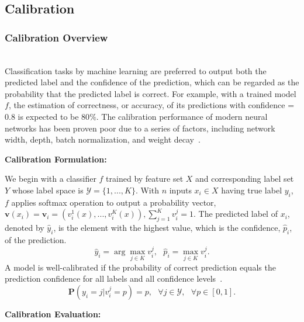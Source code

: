\subsection{Calibration}
\subsubsection{Calibration Overview}\hfill\\
Classification tasks by machine learning are preferred to output both the predicted label and the confidence of the prediction, which can be regarded as the probability that the predicted label is correct. For example, with a trained model $f$, the estimation of correctness, or accuracy, of its predictions with confidence = 0.8 is expected to be 80$\%$. The calibration performance of modern neural networks has been proven poor due to a series of factors, including network width, depth, batch normalization, and weight decay~\cite{guo2017calibration}.

\textbf{Calibration Formulation:} 

We begin with a classifier $f$ trained by feature set $X$ and corresponding label set $Y$ whose label space is $\mathcal{Y} = \{1,..., K\}$. With $n$ inputs $x_i \in X$ having true label $y_i$, $f$ applies softmax operation to output a probability vector, $\textbf{v}(x_i)=\textbf{v}_i=(v_i^1(x),...,v_i^K(x)),\sum_{j=1}^Kv_i^j=1$. The predicted label of $x_i$, denoted by $\hat{y}_i$, is the element with the highest value, which is the confidence, $\hat{p}_i$, of the prediction.
\begin{equation}
    \hat{y}_i=\arg \max_{j\in K} v_i^j,\text{ } \hat{p}_i=\max_{j\in K} v_i^j.
\end{equation}
A model is well-calibrated if the probability of correct prediction equals the prediction confidence for all labels and all confidence levels~\cite{guo2017calibration}.
\begin{equation}\label{eq: well-calibrated}
    \mathbf{P}(y_i=j|v_i^j=p)=p, \text{ } \forall j \in \mathcal{Y}, \text{ } \forall p \in [0,1].
\end{equation}

\textbf{Calibration Evaluation:} 

